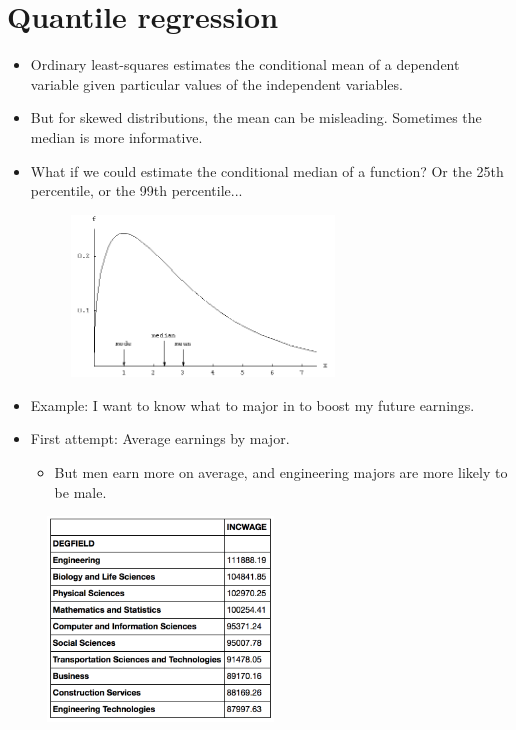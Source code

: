 \documentclass{beamer}
\begin{document}
\section{Quantile regression}

\begin{frame}
	\begin{itemize}
		\item Ordinary least-squares estimates the conditional mean of a dependent variable given particular values of the independent variables.
		\item But for skewed distributions, the mean can be misleading. Sometimes the median is more informative.
		\item What if we could estimate the conditional median of a function? Or the 25th percentile, or the 99th percentile...
		\begin{figure}
			\includegraphics[width=7cm]{skewed-distribution.png}
			\centering
		\end{figure}
	\end{itemize}
\end{frame}

\begin{frame}
	\begin{itemize}
		\item Example: I want to know what to major in to boost my future earnings.
		\item First attempt: Average earnings by major.
			\begin{itemize}
				\item But men earn more on average, and engineering majors are more likely to be male.
			\end{itemize}
	\end{itemize}
	\begin{figure}
		\includegraphics[width=6cm]{chinoy-majors-1.png}
		\centering
	\end{figure}
\end{frame}
\end{document}
